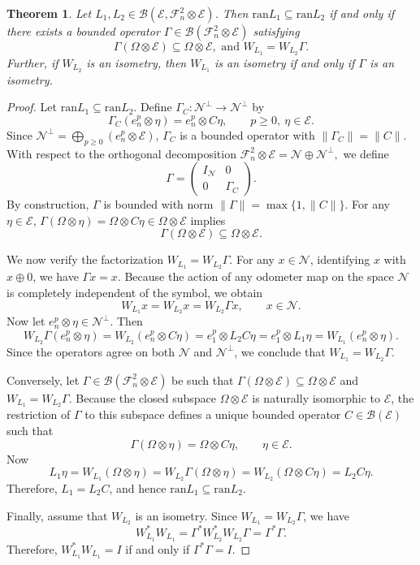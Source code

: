 \documentclass[12pt]{amsart}
\newtheorem{theorem}{Theorem}[section]
\theoremstyle{definition}
\theoremstyle{remark}
\newcommand{\clb}{\mathcal{B}}
\newcommand{\cle}{\mathcal{E}}
\newcommand{\cln}{\mathcal{N}}
\newcommand{\clf}{\mathcal{F}}
\newcommand{\ran}{\mathrm{ran}}
\numberwithin{equation}{section}
\begin{document}
\begin{theorem}\label{thm:douglas_odometer}
Let $L_1, L_2 \in \clb(\cle, \clf_n^2 \otimes \cle)$. Then $\ran L_1 \subseteq \ran L_2$ if and only if there exists a bounded operator $\Gamma \in \clb(\clf_n^2 \otimes \cle)$ 
satisfying
\[
\Gamma(\Omega \otimes \cle)\subseteq \Omega \otimes \cle, \text{ and } W_{L_1}=W_{L_2}\Gamma.
\]
Further, if $W_{L_2}$ is an isometry, then $W_{L_1}$ is an isometry if and only if $\Gamma$ is an isometry.
\end{theorem}

\begin{proof}
Let $\ran L_1\subseteq \ran L_2$. 
Define $\Gamma_C:\cln^\perp \to \cln^\perp$ by
\[
\Gamma_C(e_n^{p}\otimes \eta) = e_n^{p}\otimes C\eta, \qquad p\ge 0,\ \eta\in\cle.
\]
Since $\cln^\perp=\bigoplus_{p\ge0}(e_n^{ p}\otimes\cle)$, $\Gamma_C$ is a bounded operator with $\|\Gamma_C\|=\|C\|$. With respect to the orthogonal decomposition $\clf_n^2\otimes\cle=\cln\oplus \cln^\perp,$ we define
\[
\Gamma=
\begin{pmatrix}
I_{\cln} & 0\\
0 & \Gamma_C
\end{pmatrix}.
\]
By construction, $\Gamma$ is bounded with norm $\|\Gamma\| = \max\{1, \|C\|\}$. For any $\eta \in \cle,\, \Gamma(\Omega\otimes\eta)=\Omega\otimes C\eta\in \Omega\otimes\cle$ implies $$\Gamma(\Omega\otimes\cle) \subseteq \Omega\otimes\cle.$$ 

We now verify the factorization $W_{L_1}=W_{L_2}\Gamma$. For any $x\in \cln$, identifying $x$ with $x\oplus 0$, we have $\Gamma x = x$. Because the action of any odometer map on the space $\cln$ is completely independent of the symbol, we obtain
\[
W_{L_1}x=W_{L_2}x=W_{L_2}\Gamma x, \qquad x\in \cln.
\]
Now let $e_n^{p}\otimes\eta\in \cln^\perp$. Then
\[
W_{L_2}\Gamma(e_n^{p}\otimes\eta)
=
W_{L_2}(e_n^{p}\otimes C\eta)
=
e_1^{ p}\otimes L_2C\eta
=
e_1^{ p}\otimes L_1\eta
=
W_{L_1}(e_n^{p}\otimes\eta).
\]
Since the operators agree on both $\cln$ and $\cln^\perp$, we conclude that $W_{L_1}=W_{L_2}\Gamma$.

Conversely, let $\Gamma \in \clb(\clf_n^2 \otimes \cle)$ be such that $\Gamma(\Omega\otimes\cle)\subseteq \Omega\otimes\cle$ and   $W_{L_1}=W_{L_2}\Gamma$. Because the closed subspace $\Omega\otimes\cle$ is naturally isomorphic to $\cle$, the restriction of $\Gamma$ to this subspace defines a unique bounded operator $C\in \clb(\cle)$ such that
\[
\Gamma(\Omega\otimes\eta)=\Omega\otimes C\eta, \qquad \eta\in\cle.
\]
Now
\[
L_1\eta
=
W_{L_1}(\Omega\otimes\eta)
=
W_{L_2}\Gamma(\Omega\otimes\eta)
=
W_{L_2}(\Omega\otimes C\eta)
=
L_2C\eta.
\]
Therefore, $L_1=L_2C$, and hence $\ran L_1\subseteq \ran L_2$.

Finally, assume that $W_{L_2}$ is an isometry. Since $W_{L_1}=W_{L_2}\Gamma$, we have
\[
W_{L_1}^*W_{L_1}
=
\Gamma^*W_{L_2}^*W_{L_2}\Gamma
=
\Gamma^*\Gamma.
\]
Therefore, $W_{L_1}^*W_{L_1} = I$ if and only if $\Gamma^*\Gamma = I$.
\end{proof}
\end{document}
